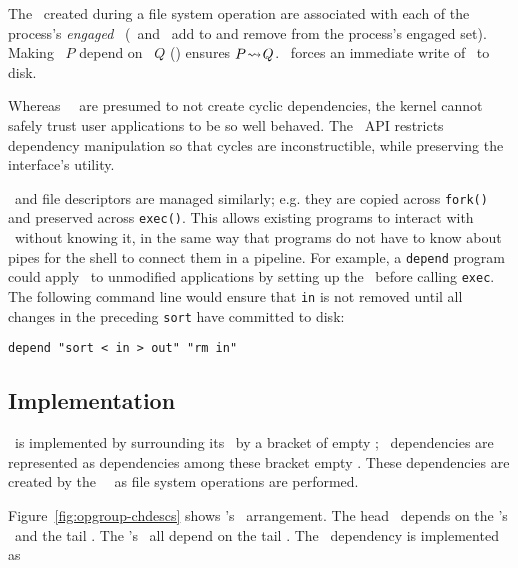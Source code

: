 The \chdescs\ created during a file system operation are associated
with each of the process's \emph{engaged} \opgroups\ (\pgEngage\ and
\pgDisengage\ add to and remove from the process's engaged set).
%
Making \opgroup\ $P$ depend on \opgroup\ $Q$ (\pgDepend)
ensures \(P\! \leadsto\! Q\).
%
\pgSync\ forces an immediate write of \anopgroup\ to disk.

Whereas \Kudos\ \modules\ are presumed to not create cyclic
dependencies, the kernel cannot safely trust user applications to be
so well behaved.
%
The \opgroup\ API restricts dependency manipulation so that cycles are
inconstructible, while preserving the interface's utility.

\Opgroups\ and file descriptors are managed similarly; e.g. they are copied
across \texttt{fork()} and preserved across \texttt{exec()}.
%
This allows existing programs to interact with \opgroups\ without
knowing it, in the same way that programs do not have to know about
pipes for the shell to connect them in a pipeline.
%
For example, a \texttt{depend} program could apply \patchgroups\ to
unmodified applications by setting up the \patchgroups\ before calling
\texttt{exec}.  The following command line would ensure that \texttt{in} is
not removed until all changes in the preceding \texttt{sort} have committed
to disk:

\vspace{-0.5\baselineskip}
\begin{center}
\begin{small}
\verb+depend "sort < in > out" "rm in"+
\end{small}
\end{center}
\vspace{-0.5\baselineskip}


\subsection{Implementation}
\label{sec:opgroup:implementation}

\Anopgroup\ is implemented by surrounding its \patches\ by a bracket of
empty \patches; \opgroup\ dependencies are represented as dependencies
among these bracket empty \patches.
%
These dependencies are created by the \opgroup\ \module\ as file
system operations are performed.

Figure~\ref{fig:opgroup-chdescs} shows \anopgroup's \chdesc\ arrangement.
%
The head \chdesc\ depends on the \opgroup's \chdescs\ and the tail
\chdesc.
%
The \opgroup's \chdescs\ all depend on the tail \chdesc.
%
The \opgroup\ dependency  is implemented as

